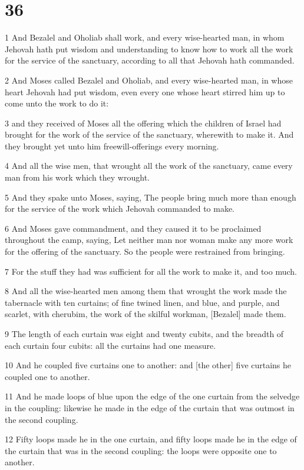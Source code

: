 \chapter{36}

\par 1 And Bezalel and Oholiab shall work, and every wise-hearted man, in whom Jehovah hath put wisdom and understanding to know how to work all the work for the service of the sanctuary, according to all that Jehovah hath commanded.
\par 2 And Moses called Bezalel and Oholiab, and every wise-hearted man, in whose heart Jehovah had put wisdom, even every one whose heart stirred him up to come unto the work to do it:
\par 3 and they received of Moses all the offering which the children of Israel had brought for the work of the service of the sanctuary, wherewith to make it. And they brought yet unto him freewill-offerings every morning.
\par 4 And all the wise men, that wrought all the work of the sanctuary, came every man from his work which they wrought.
\par 5 And they spake unto Moses, saying, The people bring much more than enough for the service of the work which Jehovah commanded to make.
\par 6 And Moses gave commandment, and they caused it to be proclaimed throughout the camp, saying, Let neither man nor woman make any more work for the offering of the sanctuary. So the people were restrained from bringing.
\par 7 For the stuff they had was sufficient for all the work to make it, and too much.
\par 8 And all the wise-hearted men among them that wrought the work made the tabernacle with ten curtains; of fine twined linen, and blue, and purple, and scarlet, with cherubim, the work of the skilful workman, [Bezalel] made them.
\par 9 The length of each curtain was eight and twenty cubits, and the breadth of each curtain four cubits: all the curtains had one measure.
\par 10 And he coupled five curtains one to another: and [the other] five curtains he coupled one to another.
\par 11 And he made loops of blue upon the edge of the one curtain from the selvedge in the coupling: likewise he made in the edge of the curtain that was outmost in the second coupling.
\par 12 Fifty loops made he in the one curtain, and fifty loops made he in the edge of the curtain that was in the second coupling: the loops were opposite one to another.
